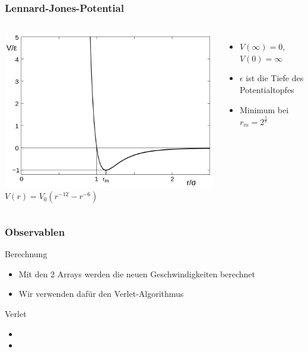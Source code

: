 \documentclass[11pt]{beamer}
\begin{document}
\begin{frame}
  \frametitle{Lennard-Jones-Potential}
   \vspace{-0.3cm}
  \begin{columns}
                \includegraphics[width=\textwidth]{img/LennardJonesPotential.png}
                \center
                \huge
                 ${V(r)=V_0 (r^{-12}-r^{-6})}$ %
                
        \pause
                \begin{itemize}
                \item $V(\infty)=0$, $V(0)=\infty$
                \item $\epsilon$ ist die Tiefe des Potentialtopfes
      			\item Minimum bei $r_{m}=2^{\frac{1}{6}}$ %
    			\end{itemize}
  \end{columns}
\end{frame}

\begin{frame}
  \frametitle{Observablen}
  \begin{block}{Berechnung}
    \begin{itemize}
      \item Mit den 2 Arrays werden die neuen Geschwindigkeiten berechnet
      \item Wir verwenden dafür den Verlet-Algorithmus
    \end{itemize}
  \end{block}
  \pause
   \begin{block}{Verlet}
    \begin{itemize}
      \item 
      \item 
    \end{itemize}
  \end{block}
\end{frame}
\end{document}
